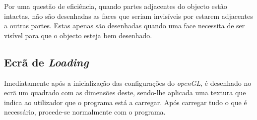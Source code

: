 \documentclass{article}
\begin{document}
  Por uma questão de eficiência, quando partes adjacentes do objecto estão intactas, não são desenhadas as faces que seriam invisíveis por estarem adjacentes a outras partes. Estas apenas são desenhadas quando uma face necessita de ser visível para que o objecto esteja bem desenhado.
 
 \subsection{Ecrã de \textit{Loading}}
  Imediatamente após a inicialização das configurações do \textit{openGL}, é desenhado no ecrã um quadrado com as dimensões deste, sendo-lhe aplicada uma textura que indica ao utilizador que o programa está a carregar. Após carregar tudo o que é necessário, procede-se normalmente com o programa.
\end{document}
